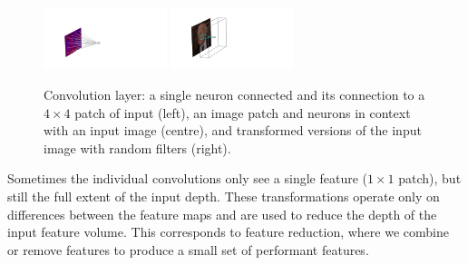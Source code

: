 \begin{figure}[h!]
    \begin{center}
        \includegraphics[width=0.32\textwidth]{figures/machine_learning/convolution_neuron.pdf}
        \includegraphics[width=0.32\textwidth]{figures/machine_learning/convolution_layer.pdf}
    \end{center}
    \caption{Convolution layer: a single neuron connected and its connection to a $4\times{}4$ patch of input (left), an image patch and neurons in context with an input image \cite{Higgs_photo} (centre), and transformed versions of the input image with random filters (right).}
        \label{fig:machine_learning:convolution}
\end{figure}

Sometimes the individual convolutions only see a single feature ($1\times{}1$ patch), but still the full extent of the input depth. These transformations operate only on differences between the feature maps and are used to reduce the depth of the input feature volume. 
This corresponds to feature reduction, where we combine or remove features to produce a small set of performant features. 



